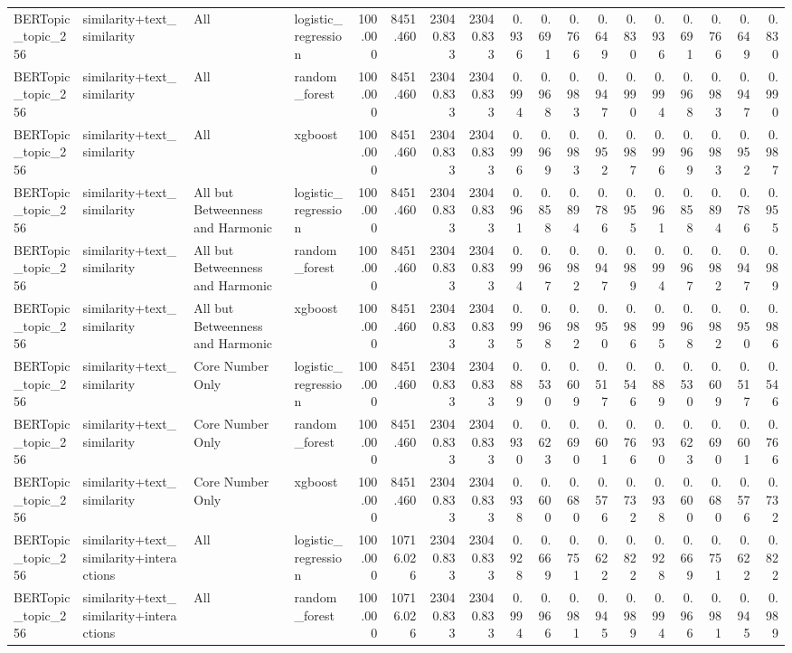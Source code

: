 \begin{tabular}{llllrrrrrrrrrrrrrr}
BERTopic_topic_256 & similarity+text_similarity & All & logistic_regression & 100.000 & 8451.460 & 23040.833 & 23040.833 & 0.936 & 0.691 & 0.766 & 0.649 & 0.830 & 0.936 & 0.691 & 0.766 & 0.649 & 0.830 \\
BERTopic_topic_256 & similarity+text_similarity & All & random_forest & 100.000 & 8451.460 & 23040.833 & 23040.833 & 0.994 & 0.968 & 0.983 & 0.947 & 0.990 & 0.994 & 0.968 & 0.983 & 0.947 & 0.990 \\
BERTopic_topic_256 & similarity+text_similarity & All & xgboost & 100.000 & 8451.460 & 23040.833 & 23040.833 & 0.996 & 0.969 & 0.983 & 0.952 & 0.987 & 0.996 & 0.969 & 0.983 & 0.952 & 0.987 \\
BERTopic_topic_256 & similarity+text_similarity & All but Betweenness and Harmonic & logistic_regression & 100.000 & 8451.460 & 23040.833 & 23040.833 & 0.961 & 0.858 & 0.894 & 0.786 & 0.955 & 0.961 & 0.858 & 0.894 & 0.786 & 0.955 \\
BERTopic_topic_256 & similarity+text_similarity & All but Betweenness and Harmonic & random_forest & 100.000 & 8451.460 & 23040.833 & 23040.833 & 0.994 & 0.967 & 0.982 & 0.947 & 0.989 & 0.994 & 0.967 & 0.982 & 0.947 & 0.989 \\
BERTopic_topic_256 & similarity+text_similarity & All but Betweenness and Harmonic & xgboost & 100.000 & 8451.460 & 23040.833 & 23040.833 & 0.995 & 0.968 & 0.982 & 0.950 & 0.986 & 0.995 & 0.968 & 0.982 & 0.950 & 0.986 \\
BERTopic_topic_256 & similarity+text_similarity & Core Number Only & logistic_regression & 100.000 & 8451.460 & 23040.833 & 23040.833 & 0.889 & 0.530 & 0.609 & 0.517 & 0.546 & 0.889 & 0.530 & 0.609 & 0.517 & 0.546 \\
BERTopic_topic_256 & similarity+text_similarity & Core Number Only & random_forest & 100.000 & 8451.460 & 23040.833 & 23040.833 & 0.930 & 0.623 & 0.690 & 0.601 & 0.766 & 0.930 & 0.623 & 0.690 & 0.601 & 0.766 \\
BERTopic_topic_256 & similarity+text_similarity & Core Number Only & xgboost & 100.000 & 8451.460 & 23040.833 & 23040.833 & 0.938 & 0.600 & 0.680 & 0.576 & 0.732 & 0.938 & 0.600 & 0.680 & 0.576 & 0.732 \\
BERTopic_topic_256 & similarity+text_similarity+interactions & All & logistic_regression & 100.000 & 10716.026 & 23040.833 & 23040.833 & 0.928 & 0.669 & 0.751 & 0.622 & 0.822 & 0.928 & 0.669 & 0.751 & 0.622 & 0.822 \\
BERTopic_topic_256 & similarity+text_similarity+interactions & All & random_forest & 100.000 & 10716.026 & 23040.833 & 23040.833 & 0.994 & 0.966 & 0.981 & 0.945 & 0.989 & 0.994 & 0.966 & 0.981 & 0.945 & 0.989 \\

\end{tabular}
